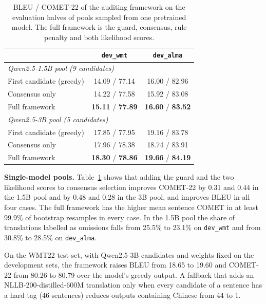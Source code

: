 \documentclass[11pt]{article}
\begin{document}
\begin{table}[t]
\centering
\small
\begin{tabular}{lcc}
\toprule
 & \texttt{dev\_wmt} & \texttt{dev\_alma} \\
\midrule
\multicolumn{3}{l}{\emph{Qwen2.5-1.5B pool (9 candidates)}}\\
First candidate (greedy) & 14.09 / 77.14 & 16.00 / 82.96 \\
Consensus only           & 14.22 / 77.58 & 15.92 / 83.08 \\
Full framework           & \textbf{15.11} / \textbf{77.89} & \textbf{16.60} / \textbf{83.52} \\
\midrule
\multicolumn{3}{l}{\emph{Qwen2.5-3B pool (5 candidates)}}\\
First candidate (greedy) & 17.85 / 77.95 & 19.16 / 83.78 \\
Consensus only           & 17.96 / 78.38 & 18.74 / 83.91 \\
Full framework           & \textbf{18.30} / \textbf{78.86} & \textbf{19.66} / \textbf{84.19} \\
\bottomrule
\end{tabular}
\caption{BLEU / COMET-22 of the auditing framework on the evaluation halves of pools sampled from one pretrained model. The full framework is the guard, consensus, rule penalty and both likelihood scores.}
\label{tab:audit_results}
\end{table}

\textbf{Single-model pools.} Table~\ref{tab:audit_results} shows that adding the guard and the two likelihood scores to consensus selection improves COMET-22 by 0.31 and 0.44 in the 1.5B pool and by 0.48 and 0.28 in the 3B pool, and improves BLEU in all four cases. The full framework has the higher mean sentence COMET in at least 99.9\% of bootstrap resamples in every case. In the 1.5B pool the share of translations labelled as omissions falls from 25.5\% to 23.1\% on \texttt{dev\_wmt} and from 30.8\% to 28.5\% on \texttt{dev\_alma}.

On the WMT22 test set, with Qwen2.5-3B candidates and weights fixed on the development sets, the framework raises BLEU from 18.65 to 19.60 and COMET-22 from 80.26 to 80.79 over the model's greedy output. A fallback that adds an NLLB-200-distilled-600M translation only when every candidate of a sentence has a hard tag (46 sentences) reduces outputs containing Chinese from 44 to 1.
\end{document}
